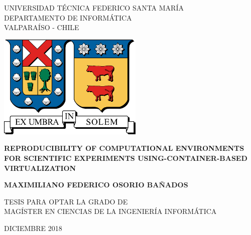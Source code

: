 
\begin{center}
  \begin{spacing}{1}
    {\large UNIVERSIDAD TÉCNICA FEDERICO SANTA MARÍA}\\
    DEPARTAMENTO DE INFORMÁTICA\\
    VALPARAÍSO - CHILE
  \end{spacing}

  \vspace{12mm}
  \includegraphics[height=50mm]{figures/utfsm.pdf}
  \vspace{15mm}

  \begin{spacing}{1.5} 
    \textbf{\large REPRODUCIBILITY OF COMPUTATIONAL ENVIRONMENTS FOR SCIENTIFIC EXPERIMENTS USING-CONTAINER-BASED VIRTUALIZATION
}\\
  \end{spacing}

  \vspace{20mm}
  \textbf{\large MAXIMILIANO FEDERICO OSORIO BAÑADOS}
  \vspace{12mm}

  \begin{spacing}{1.25} 
    TESIS PARA OPTAR LA GRADO DE\\
    MAGÍSTER EN CIENCIAS DE LA INGENIERÍA INFORMÁTICA
  \end{spacing}

  \vfill
  \large DICIEMBRE 2018
\end{center}
